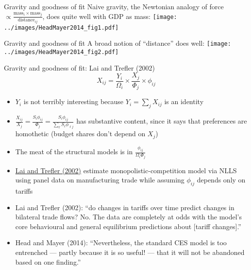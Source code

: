 \documentclass[10pt,notes=hide]{beamer}
\begin{document}
\begin{frame}{Gravity and goodness of fit}
Naive gravity,
the Newtonian analogy of force $\propto \frac{\text{mass}_i \times \text{mass}_j}{\text{distance}_{ij}}$,
does quite well with GDP as mass:
\texttt{[image: ../images/HeadMayer2014\_fig1.pdf]}
\end{frame}
\begin{frame}{Gravity and goodness of fit}
A broad notion of ``distance'' does well:
\texttt{[image: ../images/HeadMayer2014\_fig2.pdf]}
\end{frame}
\begin{frame}{Gravity and goodness of fit: Lai and Trefler (2002)}
\begin{equation*}
X_{ij} = {\frac{Y_i}{\Omega_i}} \times {\frac{X_j}{\Phi_j}} \times \phi_{ij}
\end{equation*}
\vspace{-4mm}
\begin{itemize}
	\item $Y_i$ is not terribly interesting because $Y_i = \sum_{j} X_{ij}$ is an identity
	\item $\frac{X_{ij}}{X_j} = \frac{S_{i} \phi_{ij}}{\Phi_j} = \frac{S_{i} \phi_{ij}}{\sum_{\ell} S_{\ell} \phi_{\ell j}}$ has substantive content, since it says that preferences are homothetic (budget shares don't depend on $X_j$)
	\item The meat of the structural models is in $\frac{\phi_{ij}}{\Omega_i \Phi_j}$
	\item \href{http://www-2.rotman.utoronto.ca/~dtrefler/papers/Lai_Trefler_2002.pdf}{Lai and Trefler (2002)} estimate monopolistic-competition model via NLLS using panel data on manufacturing trade while assuming $\phi_{ij}$ depends only on tariffs
	\item {\small Lai and Trefler (2002): ``do changes in tariffs over time predict changes in bilateral trade flows? No. The data are completely at odds with the model's core behavioural and general equilibrium predictions about  [tariff changes].''\par}
	\item {\small Head and Mayer (2014): ``Nevertheless, the standard CES model is too entrenched — partly because it is so useful! — that it will not be abandoned based on one finding.''\par}
\end{itemize}
\end{frame}
\end{document}

